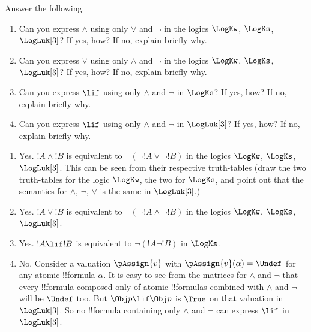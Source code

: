 \documentclass[../../../../include/open-logic-section]{subfiles}
\begin{document}
\begin{prob}
Answer the following. 
\begin{enumerate}
\item Can you express $\land$ using only $\lor$ and $\lnot$ in the
	logics $\LogKw$, $\LogKs$, $\LogLuk[3]$? If yes, how? If no, explain 
	briefly why.
\item Can you express $\lor$ using only $\land$ and $\lnot$ in the logics 
	$\LogKw$, $\LogKs$, $\LogLuk[3]$? If yes, how? If no, explain briefly 
	why.
\item Can you express $\lif$ using only $\land$ and $\lnot$ in 
	$\LogKs$? If yes, how? If no, explain briefly why.
\item Can you express $\lif$ using only $\land$ and $\lnot$ in
	$\LogLuk[3]$? If yes, how? If no, explain briefly why.
\end{enumerate}
\begin{ans}
\begin{enumerate}
\item Yes. $!A \land !B$ is equivalent to $\lnot(\lnot !A \lor \lnot !B)$
	 in the logics $\LogKw$, $\LogKs$, $\LogLuk[3]$. This can be seen from
	 their respective truth-tables (draw the two truth-tables for the logic
	 $\LogKw$, the two for $\LogKs$, and point out that the semantics
	 for $\land$, $\lnot$, $\lor$ is the same in $\LogLuk[3]$.)
\item Yes. $!A \lor !B$ is equivalent to $\lnot(\lnot !A \land \lnot !B)$ in 
	the logics $\LogKw$, $\LogKs$, $\LogLuk[3]$. 
\item Yes. $!A \lif !B$ is equivalent to $\lnot (!A \lnot !B)$ in $\LogKs$. 
\item No. Consider a valuation $\pAssign{v}$ with $\pAssign{v}(\alpha)=\Undef$ 
	for any atomic !!{formula} $\alpha$. It is easy to see from the matrices for $\land$ 
	and $\lnot$ that every !!{formula} composed only of atomic !!{formula}s combined with $\land$
	and $\lnot$ will be $\Undef$ too. But $\Obj p \lif \Obj p$ is $\True$ on that valuation
	in $\LogLuk[3]$. So no !!{formula} containing only $\land$ and $\lnot$ can 
	express $\lif$ in $\LogLuk[3]$. 
\end{enumerate}
\end{ans}
\end{prob}
\end{document}
